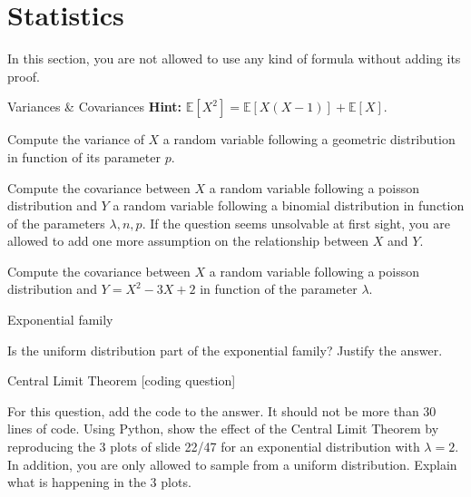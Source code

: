 \documentclass[
	ngerman,
	points=true,%
    solution=true,
    accentcolor=9c,
    colorbacktitle
	]{tudaexercise}
\begin{document}
\newpage

\section*{Statistics}
In this section, you are not allowed to use any kind of formula without adding its proof.
\begin{task}{Variances \& Covariances}
\textbf{Hint:} $\mathbb{E}\left[ X^2 \right] = \mathbb{E}[X (X - 1)] + \mathbb{E}[X]$.
\begin{subtask}
Compute the variance of $X$ a random variable following a geometric distribution in function of its parameter $p$.
\end{subtask}
\begin{solution}

\end{solution}

\begin{subtask}
Compute the covariance between $X$ a random variable following a poisson distribution and $Y$ a random variable following a binomial distribution in function of the parameters $\lambda, n, p$. If the question seems unsolvable at first sight, you are allowed to add one more assumption on the relationship between $X$ and $Y$.
\end{subtask}
\begin{solution}

\end{solution}

\begin{subtask}
Compute the covariance between $X$ a random variable following a poisson distribution and $Y = X^2 - 3X + 2$ in function of the parameter $\lambda$.
\end{subtask}
\begin{solution}

\end{solution}
\end{task}

\begin{task}{Exponential family}
\begin{subtask}
Is the uniform distribution part of the exponential family? Justify the answer.
\end{subtask}
\begin{solution}

\end{solution}
\end{task}

\begin{task}{Central Limit Theorem [coding question]}
\begin{subtask}
For this question, add the code to the answer. It should not be more than 30 lines of code. Using Python, show the effect of the Central Limit Theorem by reproducing the 3 plots of slide 22/47 for an exponential distribution with $\lambda = 2$. In addition, you are only allowed to sample from a uniform distribution. Explain what is happening in the 3 plots.
\end{subtask}
\begin{solution}

\end{solution}
\end{task}
\end{document}
